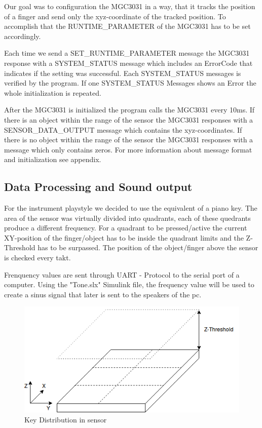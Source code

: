 \documentclass{article}
\begin{document}
\noindent Our goal was to configuration the MGC3031 in a way, that it tracks the position of a finger and send only the xyz-coordinate of the tracked position. To accomplish that the RUNTIME\_PARAMETER of the MGC3031 has to be set accordingly.

\medskip

\noindent Each time we send a SET\_RUNTIME\_PARAMETER message the MGC3031 response with a SYSTEM\_STATUS message which includes an ErrorCode that indicates if the setting was successful. Each SYSTEM\_STATUS messages is verified by the program. If one SYSTEM\_STATUS Messages shows an Error the whole initialization is repeated.

\medskip

\noindent After the MGC3031 is initialized the program calls the MGC3031 every 10ms. If there is an object within the range of the sensor the MGC3031 responses with a SENSOR\_DATA\_OUTPUT message which contains the xyz-coordinates. If there is no object within the range of the sensor the MGC3031 responses with a message which only contains zeros. For more information about message format and initialization see appendix.

\newpage

\subsection{Data Processing and Sound output}

\noindent For the instrument playstyle we decided to use the equivalent of a piano key. The area of the sensor was virtually divided into quadrants, each of these quedrants produce a different frequency. For a quadrant to be pressed/active the current XY-position of the finger/object has to be inside the quadrant limits and the Z-Threshold has to be surpassed. The position of the object/finger above the sensor is checked every takt. 

\medskip

\noindent Frenquency values are sent through UART - Protocol to the serial port of a computer. Using the "Tone.slx" Simulink file, the frequency value will be used to create a sinus signal that later is sent to the speakers of the pc. 

\begin{figure}[h]
\centering
\includegraphics[width=12cm]{SensorKeys.png}
\caption{Key Distribution in sensor}
\end{figure}
\end{document}
